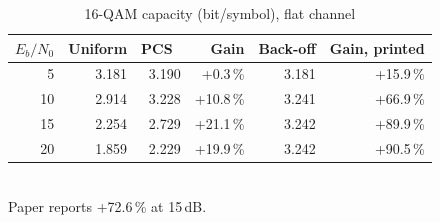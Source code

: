 \begin{table}[t]\centering\footnotesize
\caption{16-QAM capacity (bit/symbol), flat channel}\label{tab:cap}
\begin{tabular}{@{}rrrrrr@{}}\toprule
$E_b/N_0$ & Uniform & PCS~\cite{pham2026} & Gain & Back-off & Gain, printed \\\midrule
5 & 3.181 & 3.190 & +0.3\,\% & 3.181 & +15.9\,\% \\
10 & 2.914 & 3.228 & +10.8\,\% & 3.241 & +66.9\,\% \\
15 & 2.254 & 2.729 & +21.1\,\% & 3.242 & +89.9\,\% \\
20 & 1.859 & 2.229 & +19.9\,\% & 3.242 & +90.5\,\% \\
\bottomrule\end{tabular}
\vspace{1mm}\\\footnotesize Paper reports +72.6\,\% at 15\,dB.\end{table}
